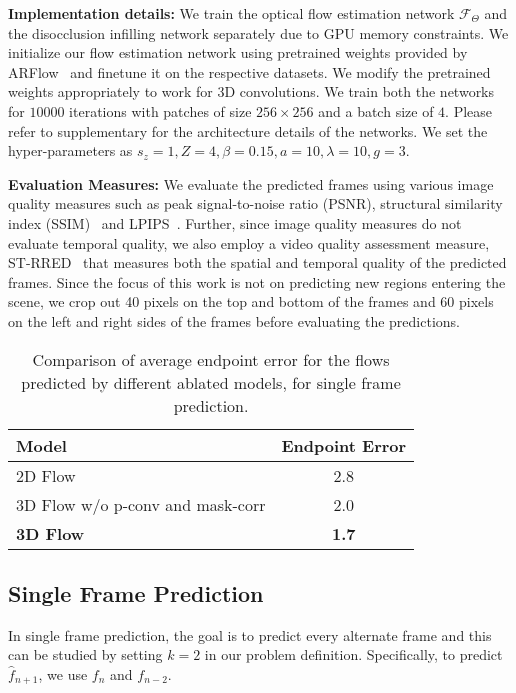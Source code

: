 \documentclass[preprint]{vgtc}
\begin{document}
    \textbf{Implementation details:}
    We train the optical flow estimation network $\mathcal{F}_{\Theta}$ and the disocclusion infilling network separately due to GPU memory constraints.
    We initialize our flow estimation network using pretrained weights provided by ARFlow~\cite{liu2020arflow} and finetune it on the respective datasets.
    We modify the pretrained weights appropriately to work for 3D convolutions.
    We train both the networks for $10000$ iterations with patches of size $256 \times 256$ and a batch size of $4$.
Please refer to supplementary for the architecture details of the networks.
    We set the hyper-parameters as $s_z=1, Z = 4, \beta = 0.15, a = 10, \lambda=10, g=3$.



    \textbf{Evaluation Measures:}
    We evaluate the predicted frames using various image quality measures such as peak signal-to-noise ratio (PSNR), structural similarity index (SSIM)~\cite{wang2004image} and LPIPS~\cite{zhang2018unreasonable}.
    Further, since image quality measures do not evaluate temporal quality, we also employ a video quality assessment measure, ST-RRED~\cite{soundararajan2013video} that measures both the spatial and temporal quality of the predicted frames.
    Since the focus of this work is not on predicting new regions entering the scene, we crop out 40 pixels on the top and bottom of the frames and 60 pixels on the left and right sides of the frames before evaluating the predictions.
    \begin{table}
        \centering
\caption{Comparison of average endpoint error for the flows predicted by different ablated models, for single frame prediction.}
        \begin{tabular}{l|c}
            \hline
            \textbf{Model} & \textbf{Endpoint Error} \\
            \hline
            2D Flow & 2.8 \\
            3D Flow w/o p-conv and mask-corr & 2.0 \\
            \textbf{3D Flow} & \textbf{1.7} \\
            \hline
        \end{tabular}
        \label{tab:ablations}
    \end{table}

    \subsection{Single Frame Prediction}\label{subsec:single-frame-prediction}
    In single frame prediction, the goal is to predict every alternate frame and this can be studied by setting $k=2$ in our problem definition.
    Specifically, to predict $\hat{f}_{n+1}$, we use $f_{n}$ and $f_{n-2}$.
\end{document}
